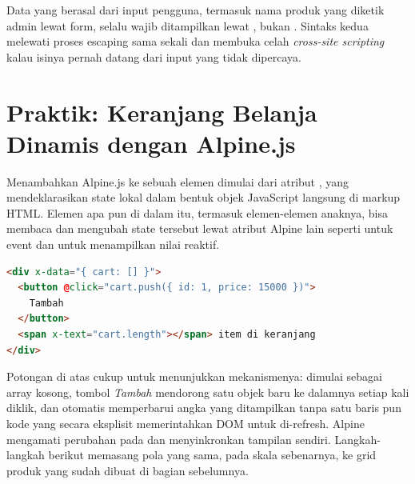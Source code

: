 \begin{warningbox}
Data yang berasal dari input pengguna, termasuk nama produk yang diketik
admin lewat form, selalu wajib ditampilkan lewat \cmd{\{\{ \}\}}, bukan
\cmd{\{!! !!\}}. Sintaks kedua melewati proses escaping sama sekali dan
membuka celah \textit{cross-site scripting} kalau isinya pernah datang dari
input yang tidak dipercaya.
\end{warningbox}

\section{Praktik: Keranjang Belanja Dinamis dengan Alpine.js}
\label{sec:blade-dan-tailwind-3}

Menambahkan Alpine.js ke sebuah elemen dimulai dari atribut ,
yang mendeklarasikan state lokal dalam bentuk objek JavaScript langsung di
markup HTML. Elemen apa pun di dalam  itu, termasuk
elemen-elemen anaknya, bisa membaca dan mengubah state tersebut lewat
atribut Alpine lain seperti  untuk event dan  untuk
menampilkan nilai reaktif.

\begin{lstlisting}[language=html]
<div x-data="{ cart: [] }">
  <button @click="cart.push({ id: 1, price: 15000 })">
    Tambah
  </button>
  <span x-text="cart.length"></span> item di keranjang
</div>
\end{lstlisting}

Potongan di atas cukup untuk menunjukkan mekanismenya:  dimulai
sebagai array kosong, tombol \textit{Tambah} mendorong satu objek baru ke
dalamnya setiap kali diklik, dan  otomatis
memperbarui angka yang ditampilkan tanpa satu baris pun kode yang secara
eksplisit memerintahkan DOM untuk di-refresh. Alpine mengamati perubahan
pada  dan menyinkronkan tampilan sendiri. Langkah-langkah
berikut memasang pola yang sama, pada skala sebenarnya, ke grid produk
 yang sudah dibuat di bagian sebelumnya.

